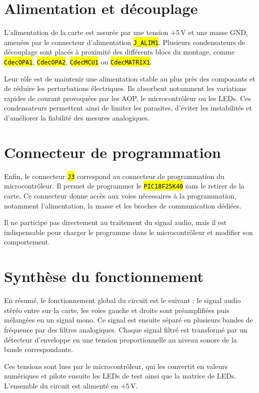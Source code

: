 \documentclass{report}
\let\OldTexttt\texttt
\renewcommand{\texttt}[1]{\OldTexttt{\hl{#1}}}
\begin{document}
\section{Alimentation et découplage}

L'alimentation de la carte est assurée par une tension \(+5\,\mathrm{V}\) et une masse \(\mathrm{GND}\), amenées par le connecteur d'alimentation \texttt{J\_ALIM1}. Plusieurs condensateurs de découplage sont placés à proximité des différents blocs du montage, comme \texttt{CdecOPA1}, \texttt{CdecOPA2}, \texttt{CdecMCU1} ou \texttt{CdecMATRIX1}.

Leur rôle est de maintenir une alimentation stable au plus près des composants et de réduire les perturbations électriques. Ils absorbent notamment les variations rapides de courant provoquées par les AOP, le microcontrôleur ou les LEDs. Ces condensateurs permettent ainsi de limiter les parasites, d'éviter les instabilités et d'améliorer la fiabilité des mesures analogiques.

\section{Connecteur de programmation}

Enfin, le connecteur \texttt{J3} correspond au connecteur de programmation du microcontrôleur. Il permet de programmer le \texttt{PIC18F25K40} sans le retirer de la carte. Ce connecteur donne accès aux voies nécessaires à la programmation, notamment l'alimentation, la masse et les broches de communication dédiées.

Il ne participe pas directement au traitement du signal audio, mais il est indispensable pour charger le programme dans le microcontrôleur et modifier son comportement.

\section{Synthèse du fonctionnement}

En résumé, le fonctionnement global du circuit est le suivant : le signal audio stéréo entre sur la carte, les voies gauche et droite sont préamplifiées puis mélangées en un signal mono. Ce signal est ensuite séparé en plusieurs bandes de fréquence par des filtres analogiques. Chaque signal filtré est transformé par un détecteur d'enveloppe en une tension proportionnelle au niveau sonore de la bande correspondante.

Ces tensions sont lues par le microcontrôleur, qui les convertit en valeurs numériques et pilote ensuite les LEDs de test ainsi que la matrice de LEDs. L'ensemble du circuit est alimenté en \(+5\,\mathrm{V}\).
\end{document}
